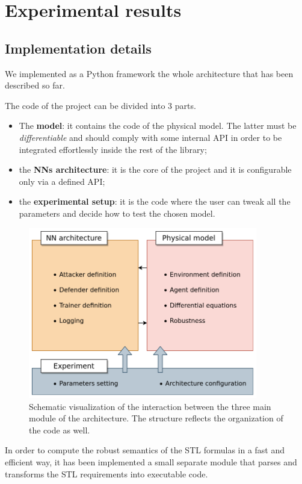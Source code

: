 \chapter{Experimental results}

\section{Implementation details}
We implemented as a Python framework the whole architecture that has been described so far.

The code of the project can be divided into 3 parts.
\begin{itemize}
  \item The \textbf{model}: it contains the code of the physical model. The latter must be \textit{differentiable} and should comply with some internal API in order to be integrated effortlessly inside the rest of the library;
  \item the \textbf{NNs architecture}: it is the core of the project and it is configurable only via a defined API;
  \item the \textbf{experimental setup}: it is the code where the user can tweak all the parameters and decide how to test the chosen model.
\end{itemize}

\begin{figure}[H]
	\centering
	\includegraphics[width=10cm, keepaspectratio]{img/5_1_module_api.png}
	\caption{Schematic visualization of the interaction between the three main module of the architecture. The structure reflects the organization of the code as well.}
\end{figure}

In order to compute the robust semantics of the STL formulas in a fast and efficient way, it has been implemented a small separate module that parses and transforms the STL requirements into executable code.

